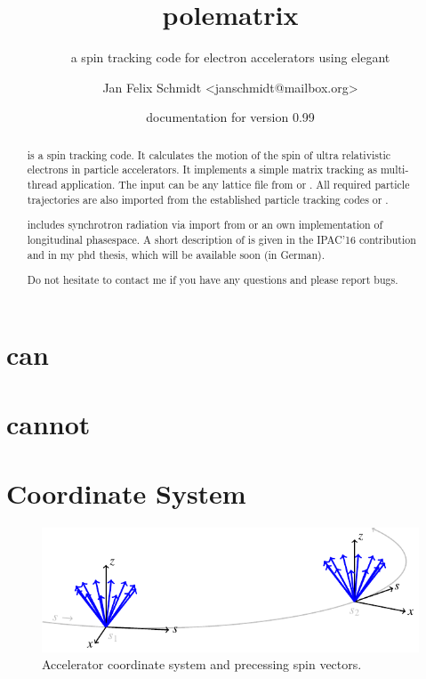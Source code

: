 \documentclass[a4paper]{scrartcl}
\author{Jan Felix Schmidt \textless janschmidt@mailbox.org\textgreater}
\title{polematrix}
\subtitle{a spin tracking code for electron accelerators using elegant}
\date{documentation for version 0.99}
\begin{document}
\maketitle

\begin{abstract}
  \polem is a spin tracking code. It calculates the motion of the spin of ultra
  relativistic electrons in particle accelerators. It implements a simple matrix tracking
  as multi-thread \cpp application. The input can be any lattice file from \ele or
  \madx. All required particle trajectories are also imported from the established
  particle tracking codes \ele or \madx.

  \polem includes synchrotron radiation via import from \ele or an own implementation of
  longitudinal phasespace. A short description of \polem is given in the IPAC'16
  contribution \cite{IPAC16-decoh} and in my phd thesis, which will be available soon (in
  German).
  
  Do not hesitate to contact me if you have any questions and please report bugs.
\end{abstract}

\tableofcontents
\clearpage


\section{\polem can}
\label{sec:polem-can}

\section{\polem cannot}
\label{sec:polem-cannot}


\section{Coordinate System}
\label{sec:coord}

\begin{figure}
  \centering
  \includegraphics{coord}
  \caption{Accelerator coordinate system and precessing spin vectors. \cite{dr}}
  \label{fig:coord}
\end{figure}
\end{document}
